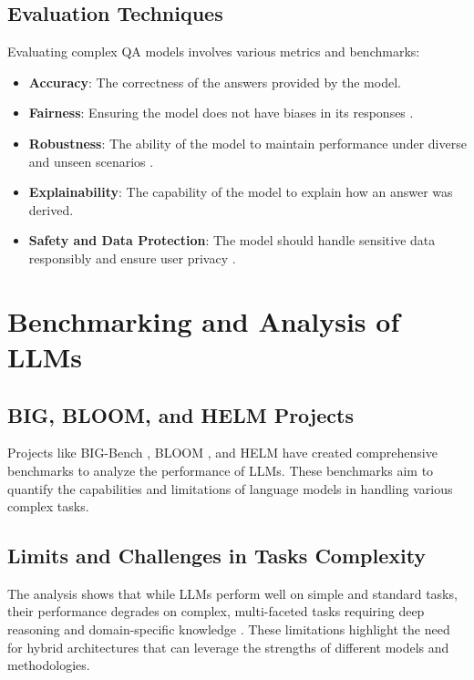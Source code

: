\documentclass{article}
\begin{document}
\subsection{Evaluation Techniques}
Evaluating complex QA models involves various metrics and benchmarks:
\begin{itemize}
    \item \textbf{Accuracy}: The correctness of the answers provided by the model.
    \item \textbf{Fairness}: Ensuring the model does not have biases in its responses \cite{bolukbasi2016man}.
    \item \textbf{Robustness}: The ability of the model to maintain performance under diverse and unseen scenarios \cite{hendrycks2020pretrained}.
    \item \textbf{Explainability}: The capability of the model to explain how an answer was derived.
    \item \textbf{Safety and Data Protection}: The model should handle sensitive data responsibly and ensure user privacy \cite{zhang2023model}.
\end{itemize}

\section{Benchmarking and Analysis of LLMs}
\label{sec:benchmarking}

\subsection{BIG, BLOOM, and HELM Projects}
Projects like BIG-Bench \cite{srivastava2022beyond}, BLOOM \cite{scao2022bloom}, and HELM \cite{bommasani2021opportunities} have created comprehensive benchmarks to analyze the performance of LLMs. These benchmarks aim to quantify the capabilities and limitations of language models in handling various complex tasks.

\subsection{Limits and Challenges in Tasks Complexity}
The analysis shows that while LLMs perform well on simple and standard tasks, their performance degrades on complex, multi-faceted tasks requiring deep reasoning and domain-specific knowledge \cite{bender2021dangers}. These limitations highlight the need for hybrid architectures that can leverage the strengths of different models and methodologies.
\end{document}
